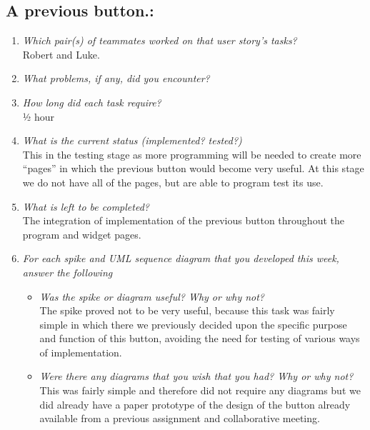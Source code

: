\documentclass[12pt, letterpaper]{article}
\begin{document}
\subsection{A previous button.:}
\begin{enumerate}
	\item \emph{Which pair(s) of teammates worked on that user story's tasks?}
	\\Robert and Luke.
	\item \emph{What problems, if any, did you encounter?}
	\item \emph{How long did each task require?}
	\\½ hour
	\item \emph{What is the current status (implemented? tested?)}
	\\This in the testing stage as more programming will be needed to create more “pages” in which the previous button would become very useful. At this stage we do not have all of the pages, but are able to program test its use.
	\item \emph{What is left to be completed?}
	\\The integration of implementation of the previous button throughout the program and widget pages.
	\item \emph{For each spike and UML sequence diagram that you developed this week, answer the following}
	\begin{itemize}
		\item \emph{Was the spike or diagram useful? Why or why not?}
		\\The spike proved not to be very useful, because this task was fairly simple in which there we previously decided upon the specific purpose and function of this button, avoiding the need for testing of various ways of implementation.
		\item \emph{Were there any diagrams that you wish that you had? Why or why not?}
		\\This was fairly simple and therefore did not require any diagrams but we did already have a paper prototype of the design of the button already available from a previous assignment and collaborative meeting.
	\end{itemize}
\end{enumerate}
	
	
	
\end{document}
